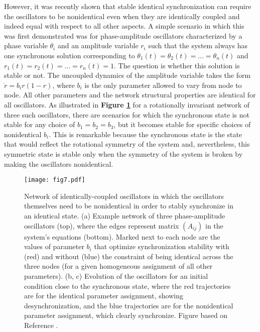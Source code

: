 \documentclass[
preprint,
superscriptaddress,
aps,
prl,
]{revtex4-1}
\begin{document}
However, it was recently shown that
stable 
   {\color{black} identical} synchronization can require the oscillators to be nonidentical even when they are identically coupled and indeed equal with respect to all other aspects.  A simple scenario in which this was first demonstrated \cite{nishikawa2016symmetric} was for phase-amplitude oscillators 
characterized by a phase variable $\theta_i$ and an amplitude variable $r_i$ such that the system always has one synchronous solution corresponding 
   {\color{black} to}   
{\color{black} $\theta_1(t)=\theta_2(t)=\dots = \theta_n(t)$ and $ r_1(t)= r_2(t)=\dots =r_n (t)= 1$.}
The question is whether this solution is stable or not. The uncoupled dynamics of the amplitude variable takes the form $\dot r= b_i r(1-r)$, where $ b_i$ is the only parameter allowed to vary from node to node. All other parameters and the network structural properties are identical for all oscillators. As illustrated in \textbf{Figure \ref{fig7}} for a rotationally invariant network of three such oscillators, there are scenarios for which the synchronous state is not stable for any choice of $b_1=b_2=b_3$, but it becomes stable for specific choices of nonidentical $b_i$. This is remarkable because the synchronous state is the state that would reflect the rotational symmetry of the 
  {\color{black} system and, nevertheless, this symmetric state is} 
  stable only when 
   {\color{black} the}
 symmetry of the system is broken by 
making the oscillators nonidentical. 

\begin{figure}[t]  
\texttt{[image: fig7.pdf]}
\caption{Network of identically-coupled oscillators in which the oscillators themselves need to be nonidentical in order to stably synchronize in an identical state.
(a)  Example network of three phase-amplitude oscillators (top), where the edges represent matrix $(A_{ij})$ in the system's equations (bottom).
Marked next to each node are the values of parameter $b_i$ that
optimize synchronization stability with (red) and without (blue) the constraint of 
being identical across the three nodes (for a given homogeneous assignment of all other parameters).
(b, c) Evolution of the oscillators for an initial condition close to the synchronous state, where the red trajectories are for the identical 
parameter assignment,  showing desynchronization, and the blue trajectories are for the  nonidentical  parameter
assignment, which clearly synchronize.
Figure based on Reference \cite{nishikawa2016symmetric}.
}
\label{fig7}
\end{figure}
\end{document}
